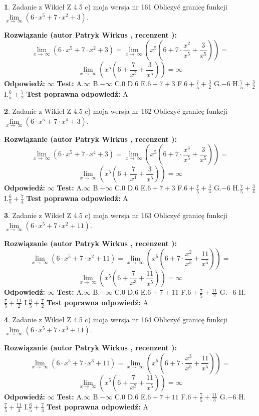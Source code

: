 \documentclass[12pt, a4paper]{article}
\theoremstyle{definition} %
\newtheorem{zad}{}
\newcommand{\zadStart}[1]{\begin{zad}#1\newline}
\newcommand{\zadStop}{\end{zad}}
\newcommand{\rozwStart}[2]{\noindent \textbf{Rozwiązanie (autor #1 , recenzent #2): }\newline}
\newcommand{\rozwStop}{\newline}
\newcommand{\odpStart}{\noindent \textbf{Odpowiedź:}\newline}
\newcommand{\odpStop}{\newline}
\newcommand{\testStart}{\noindent \textbf{Test:}\newline}
\newcommand{\testStop}{\newline}
\newcommand{\kluczStart}{\noindent \textbf{Test poprawna odpowiedź:}\newline}
\newcommand{\kluczStop}{\newline}
\begin{document}
\zadStart{Zadanie z Wikieł Z 4.5 c) moja wersja nr 161}
Obliczyć granicę funkcji  $\lim\limits_{x\to\ \infty}(6 \cdot x^{5}+7 \cdot x^{2}+3)$.
\zadStop
\rozwStart{Patryk Wirkus}{}
$$\lim\limits_{x\to\ \infty}(6 \cdot x^{5}+7 \cdot x^{2}+3) = \lim\limits_{x\to\ \infty}(x^{5}(6 +7 \cdot \frac{x^{2}}{x^{5}}+\frac{3}{x^{5}})) =$$ $$\lim\limits_{x\to\ \infty}(x^{5}(6 +\frac{7}{x^{3}}+\frac{3}{x^{5}})) =\infty$$
\rozwStop
\odpStart
$\infty$
\odpStop
\testStart
A.$\infty$ B.$-\infty$ C.$0$ D.$6$ E.$6 + 7 + 3$
F.$6+\frac{7}{5}+\frac{3}{2}$ G.$-6$
H.$\frac{7}{5}+\frac{3}{2}$
I.$\frac{6}{5}+\frac{7}{2}$
\testStop
\kluczStart
A
\kluczStop



\zadStart{Zadanie z Wikieł Z 4.5 c) moja wersja nr 162}
Obliczyć granicę funkcji  $\lim\limits_{x\to\ \infty}(6 \cdot x^{5}+7 \cdot x^{4}+3)$.
\zadStop
\rozwStart{Patryk Wirkus}{}
$$\lim\limits_{x\to\ \infty}(6 \cdot x^{5}+7 \cdot x^{4}+3) = \lim\limits_{x\to\ \infty}(x^{5}(6 +7 \cdot \frac{x^{4}}{x^{5}}+\frac{3}{x^{5}})) =$$ $$\lim\limits_{x\to\ \infty}(x^{5}(6 +\frac{7}{x^{1}}+\frac{3}{x^{5}})) =\infty$$
\rozwStop
\odpStart
$\infty$
\odpStop
\testStart
A.$\infty$ B.$-\infty$ C.$0$ D.$6$ E.$6 + 7 + 3$
F.$6+\frac{7}{5}+\frac{3}{4}$ G.$-6$
H.$\frac{7}{5}+\frac{3}{4}$
I.$\frac{6}{5}+\frac{7}{4}$
\testStop
\kluczStart
A
\kluczStop



\zadStart{Zadanie z Wikieł Z 4.5 c) moja wersja nr 163}
Obliczyć granicę funkcji  $\lim\limits_{x\to\ \infty}(6 \cdot x^{5}+7 \cdot x^{2}+11)$.
\zadStop
\rozwStart{Patryk Wirkus}{}
$$\lim\limits_{x\to\ \infty}(6 \cdot x^{5}+7 \cdot x^{2}+11) = \lim\limits_{x\to\ \infty}(x^{5}(6 +7 \cdot \frac{x^{2}}{x^{5}}+\frac{11}{x^{5}})) =$$ $$\lim\limits_{x\to\ \infty}(x^{5}(6 +\frac{7}{x^{3}}+\frac{11}{x^{5}})) =\infty$$
\rozwStop
\odpStart
$\infty$
\odpStop
\testStart
A.$\infty$ B.$-\infty$ C.$0$ D.$6$ E.$6 + 7 + 11$
F.$6+\frac{7}{5}+\frac{11}{2}$ G.$-6$
H.$\frac{7}{5}+\frac{11}{2}$
I.$\frac{6}{5}+\frac{7}{2}$
\testStop
\kluczStart
A
\kluczStop



\zadStart{Zadanie z Wikieł Z 4.5 c) moja wersja nr 164}
Obliczyć granicę funkcji  $\lim\limits_{x\to\ \infty}(6 \cdot x^{5}+7 \cdot x^{3}+11)$.
\zadStop
\rozwStart{Patryk Wirkus}{}
$$\lim\limits_{x\to\ \infty}(6 \cdot x^{5}+7 \cdot x^{3}+11) = \lim\limits_{x\to\ \infty}(x^{5}(6 +7 \cdot \frac{x^{3}}{x^{5}}+\frac{11}{x^{5}})) =$$ $$\lim\limits_{x\to\ \infty}(x^{5}(6 +\frac{7}{x^{2}}+\frac{11}{x^{5}})) =\infty$$
\rozwStop
\odpStart
$\infty$
\odpStop
\testStart
A.$\infty$ B.$-\infty$ C.$0$ D.$6$ E.$6 + 7 + 11$
F.$6+\frac{7}{5}+\frac{11}{3}$ G.$-6$
H.$\frac{7}{5}+\frac{11}{3}$
I.$\frac{6}{5}+\frac{7}{3}$
\testStop
\kluczStart
A
\kluczStop
\end{document}

